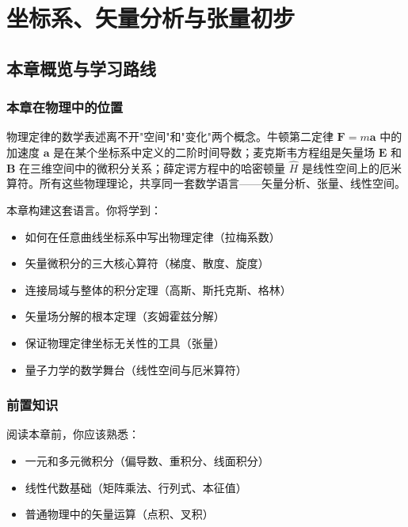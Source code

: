 
\chapter{坐标系、矢量分析与张量初步}

\section{本章概览与学习路线}

\subsection{本章在物理中的位置}

物理定律的数学表述离不开"空间"和"变化"两个概念。牛顿第二定律 $\mathbf{F}=m\mathbf{a}$ 中的加速度 $\mathbf{a}$ 是在某个坐标系中定义的二阶时间导数；麦克斯韦方程组是矢量场 $\mathbf{E}$ 和 $\mathbf{B}$ 在三维空间中的微积分关系；薛定谔方程中的哈密顿量 $\hat{H}$ 是线性空间上的厄米算符。所有这些物理理论，共享同一套数学语言——矢量分析、张量、线性空间。

本章构建这套语言。你将学到：

\begin{itemize}
  \item 如何在任意曲线坐标系中写出物理定律（拉梅系数）
  \item 矢量微积分的三大核心算符（梯度、散度、旋度）
  \item 连接局域与整体的积分定理（高斯、斯托克斯、格林）
  \item 矢量场分解的根本定理（亥姆霍兹分解）
  \item 保证物理定律坐标无关性的工具（张量）
  \item 量子力学的数学舞台（线性空间与厄米算符）
\end{itemize}

\subsection{前置知识}

阅读本章前，你应该熟悉：
\begin{itemize}
  \item 一元和多元微积分（偏导数、重积分、线面积分）
  \item 线性代数基础（矩阵乘法、行列式、本征值）
  \item 普通物理中的矢量运算（点积、叉积）
\end{itemize}

